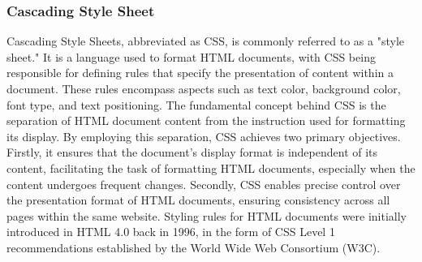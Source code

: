 \documentclass[12pt,oneside,openright,a4paper]{cpe-english-project}
\begin{document}
      \subsubsection{Cascading Style Sheet}
        \qquad Cascading Style Sheets, abbreviated as CSS, is commonly referred to as a "style sheet." It is a language used to format HTML documents, with CSS being responsible for defining rules that specify the presentation of content within a document. These rules encompass aspects such as text color, background color, font type, and text positioning. The fundamental concept behind CSS is the separation of HTML document content from the instruction used for formatting its display. By employing this separation, CSS achieves two primary objectives. Firstly, it ensures that the document's display format is independent of its content, facilitating the task of formatting HTML documents, especially when the content undergoes frequent changes. Secondly, CSS enables precise control over the presentation format of HTML documents, ensuring consistency across all pages within the same website. Styling rules for HTML documents were initially introduced in HTML 4.0 back in 1996, in the form of CSS Level 1 recommendations established by the World Wide Web Consortium (W3C).\par
    
\end{document}
